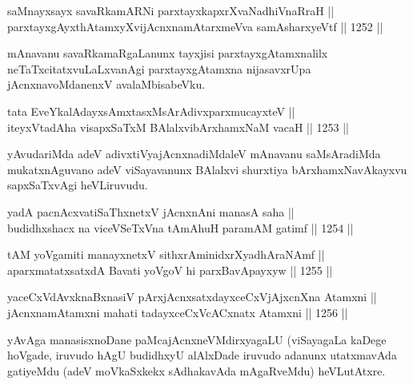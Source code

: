 
\begin{shl}
saMnayxsayx savaRkamARNi parxtayxkapxrXvaNadhiVnaRraH || \\
parxtayxgAyxthAtamxyXvijAcnxnamAtarxmeVva samAsharxyeVtf \hfill || 1252 ||  
\end{shl}

\begin{artha}
mAnavanu savaRkamaRgaLanunx tayxjisi parxtayxgAtamxnalilx neTaTxcitatxvuLaLxvanAgi parxtayxgAtamxna nijasavxrUpa jAcnxnavoMdanenxV avalaMbisabeVku.
\end{artha}

\begin{shl}
tata EveYkalAdayxsAmxtasxMsArAdivxparxmucayxteV || \\
iteyxVtadAha visapxSaTxM BAlalxvibArxhamxNaM vacaH \hfill || 1253 ||  
\end{shl}

\begin{artha}
yAvudariMda adeV adivxtiVyajAcnxnadiMdaleV mAnavanu saMsAradiMda mukatxnAguvano adeV viSayavanunx BAlalxvi shurxtiya bArxhamxNavAkayxvu sapxSaTxvAgi heVLiruvudu.
\end{artha}


\begin{shl}
yadA pacnAcxvatiSaThxnetxV jAcnxnAni manasA saha || \\
budidhxshacx na viceVSeTxVna tAmAhuH paramAM gatimf \hfill || 1254 ||  
\end{shl}
				
\begin{shl}
tAM yoVgamiti manayxnetxV sithxrAminidxrXyadhAraNAmf || \\
aparxmatatxsatxdA Bavati yoVgoV hi parxBavApayxyw \hfill || 1255 ||  
\end{shl}

\begin{shl}
yaceCxVdAvxknaBxnasiV pArxjAcnxsatxdayxceCxVjAjxcnXna Atamxni || \\
jAcnxnamAtamxni mahati tadayxceCxVcACxnatx Atamxni \hfill || 1256 ||  
\end{shl}

\begin{artha}
yAvAga manasisxnoDane paMcajAcnxneVMdirxyagaLU (viSayagaLa kaDege hoVgade, iruvudo hAgU budidhxyU alAlxDade iruvudo adanunx utatxmavAda gatiyeMdu (adeV moVkaSxkekx sAdhakavAda mAgaRveMdu) heVLutAtxre.
\end{artha}

